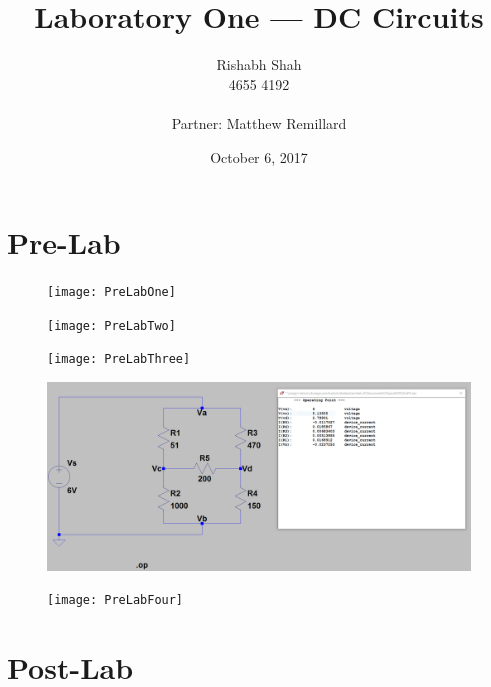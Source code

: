\documentclass[10pt]{article}
\begin{document}
\title{Laboratory One --- DC Circuits}
\date{October 6, 2017}
\author{Rishabh Shah\\ 4655 4192\\ \\ Partner: Matthew Remillard}
\maketitle
\newpage

\section*{Pre-Lab}
\begin{figure}[H]
	\centering
	\texttt{[image: PreLabOne]}
\end{figure}
\begin{figure}[H]
	\centering
	\texttt{[image: PreLabTwo]}
\end{figure}
\begin{figure}[H]
	\centering
	\texttt{[image: PreLabThree]}
\end{figure}
\begin{figure}[H]
	\centering
	\includegraphics[width=\textwidth]{PreLabPartFour}
\end{figure}
\begin{figure}[H]
	\centering
	\texttt{[image: PreLabFour]}
\end{figure}

\section*{Post-Lab}
\end{document}
